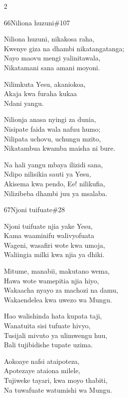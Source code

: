 \documentclass{article}
\begin{document}
\begin{multicols}{2}
\begin{hymn}{66}{Niliona huzuni}{\#107}
\begin{stanza}
Niliona huzuni, nikakosa raha,\\
Kwenye giza na dhambi nikatangatanga;\\
Nayo maovu mengi yalinitawala,\\
Nikatamani sana amani moyoni.
\end{stanza}
\begin{chorus}
Nilimkuta Yesu, akaniokoa,\\
Akaja kwa furaha kukaa\\
Ndani yangu.
\end{chorus}
\begin{stanza}
Nilionja anasa nyingi za dunia,\\
Nisipate faida wala nafuu humo;\\
Nilipata uchovu, uchungu mzito,\\
Nikatambua kwamba maisha ni bure.
\end{stanza}
\begin{stanza}
Na hali yangu mbaya ilizidi sana,\\
Ndipo nilisikia sauti ya Yesu,\\
Akisema kwa pendo, Ee! nilikufia,\\
Nilizibeba dhambi juu ya msalaba.
\end{stanza}
\end{hymn}

\begin{hymn}{67}{Njoni tuifuate}{\#28}
\begin{stanza}
Njoni tuifuate njia yake Yesu,\\
Kama waaminifu walivyofuata\\
Wageni, wasafiri wote kwa umoja,\\
Waliingia milki kwa njia ya dhiki.
\end{stanza}
\begin{stanza}
Mitume, manabii, makutano wema,\\
Hawa wote wamepitia njia hiyo,\\
Wakaacha nyayo za machozi na damu,\\
Wakaendelea kwa uwezo wa Mungu.
\end{stanza}
\begin{stanza}
Hao walishinda hata kupata taji,\\
Wanatuita sisi tufuate hivyo,\\
Tusijali mivuto ya ulimwengu huu,\\
Bali tujibidishe tupate uzima.
\end{stanza}
\begin{stanza}
Aokoaye nafsi ataipoteza,\\
Apotezaye ataiona milele,\\
Tujiweke tayari, kwa moyo thabiti,\\
Na tuwafuate watumishi wa Mungu.
\end{stanza}
\end{hymn}


\end{multicols}
\end{document}

